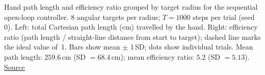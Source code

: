 Hand path length and efficiency ratio grouped by target radius for the sequential open-loop controller. 8 angular targets per radius; $T=1000$ steps per trial (seed 0). Left: total Cartesian path length (cm) travelled by the hand. Right: efficiency ratio (path length / straight-line distance from start to target); dashed line marks the ideal value of~1. Bars show mean $\pm$ 1\,SD; dots show individual trials. Mean path length: $259.6$\,cm (SD $= 68.4$\,cm); mean efficiency ratio: $5.2$ (SD $= 5.13$). \href{https://github.com/tahmidazam/gg4/blob/main/notebooks/cartesian_control_path_length/cartesian_control_path_length.ipynb}{\underline{Source}}%